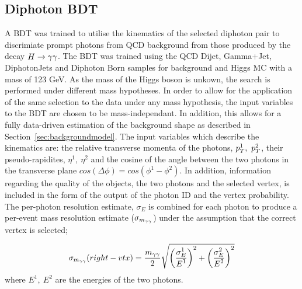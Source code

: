 \subsection{Diphoton BDT}
\label{sec:diphotonbdt}
A BDT was trained to utilise the kinematics of the selected diphoton pair to discrimiate prompt photons
from QCD background from those produced by the decay $H\rightarrow\gamma\gamma$. The BDT was trained using the QCD Dijet,
Gamma+Jet, DiphotonJets and Diphoton Born samples for background and Higgs MC with a mass of 123 GeV.
As the mass of the Higgs boson is unkown, the search is performed under different mass hypotheses.
In order to allow for the application of the same selection to the data under any mass hypothesis,
the input variables to the BDT are chosen to be mass-independant. In addition, this allows
for a fully data-driven estimation of the background shape as described in Section~\ref{sec:backgroundmodel}.
The input variables which describe the kinematics are:
the relative transverse momenta of the photons, $p_{T}^{1},~p_{T}^{2}$, 
their pseudo-rapidites, $\eta^{1},~\eta^{2}$ and the cosine of the 
angle between the two photons in the transverse plane $cos(\Delta\phi)=cos(\phi^{1}-\phi^{2})$.
In addition, information regarding the quality
of the objects, the two photons and the selected vertex, is included in the form of the output of the 
photon ID and the vertex probability. The per-photon resolution estimate, $\sigma_{E}$ is combined for
each photon to produce a per-event mass resolution estimate ($\sigma_{m_{\gamma\gamma}}$) under the assumption that 
the correct vertex is selected;

\begin{equation}
\sigma_{m_{\gamma\gamma}} (right-vtx) = \frac{\displaystyle m_{\gamma\gamma}}{\displaystyle 2} 
\sqrt{ \left( \frac{\displaystyle {\sigma_{E}^{1}}}{\displaystyle E^{1} } \right)^{2}
     + \left( \frac{\displaystyle {\sigma_{E}^{2}}}{\displaystyle E^{2} } \right)^{2}
     }
\end{equation}
where $E^{1},~E^{2}$ are the energies of the two photons.

